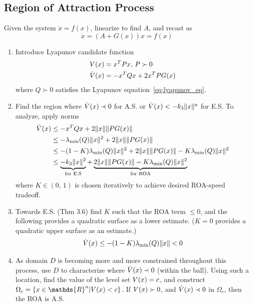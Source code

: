 \documentclass[twocolumn]{article}    %
\begin{document}
\subsection*{Region of Attraction Process}
Given the system \(\dot{x} = f(x)\), linearize to find \(A\), and recast as 
\begin{equation*}
    \dot{x}= (A + G(x)) x = f(x) 
\end{equation*}
\begin{enumerate}
    \item Introduce Lyapunov candidate function 
    \begin{align*}
        V(x) &= x^TPx,\, P \succ 0 \\
        \dot{V}(x) &= -x^TQx + 2x^TPG(x)
    \end{align*}
    where \(Q \succ 0\) satisfies the Lyapunov equation~\eqref{eq:lyapunov_eq}.

    \item Find the region where \(\dot{V}(x) \prec 0\) for A.S. or \(\dot{V}(x) < -k_3\|x\|^a\) for E.S. To analyze, apply norms
    \begin{align*}
        \dot{V}(x) & \leq -x^TQx + 2\|x\| \|PG(x)\|\\
        & \leq -\lambda_{\min} (Q) \|x\|^2 + 2\|x\| \|PG(x)\|\\
        & \leq -(1-K)\lambda_{\min} (Q)\|x\|^2 + 2\|x\| \|PG(x)\| - K\lambda_{\min} (Q) \|x\|^2\\
        & \leq \underbrace{-k_3 \|x\|^2}_{\text{for E.S}} + \underbrace{2\|x\| \|PG(x)\| - K\lambda_{\min} (Q) \|x\|^2}_{\text{for ROA}}
    \end{align*}
    where \(K\in(0,\,1)\) is chosen iteratively to achieve desired ROA-speed tradeoff.

    \item Towards E.S. (Thm 3.6) find \(K\) such that the ROA term \(\leq0\), and the following provides a quadratic surface as a lower estimate. (\(K=0\) provides a quadratic upper surface as an estimate.) 
    \begin{equation*}
        \dot{V}(x) \leq -(1-K)\lambda_{\min}(Q) \|x\| < 0 
    \end{equation*}

    \item As domain \(D\) is becoming more and more constrained throughout this process, use \(D\) to characterize where \(\dot{V}(x) \prec 0\) (within the ball). Using such a location, find the value of the level set \(V(x) = c\), and construct \(\Omega_c = \{ x \in \mathds{R}^n | \vofx < c\}\). If \(V(x) \succ 0\), and \(\dot{V}(x) \prec 0\) in \(\Omega_c\), then the ROA is A.S.


\end{enumerate}
\end{document}
